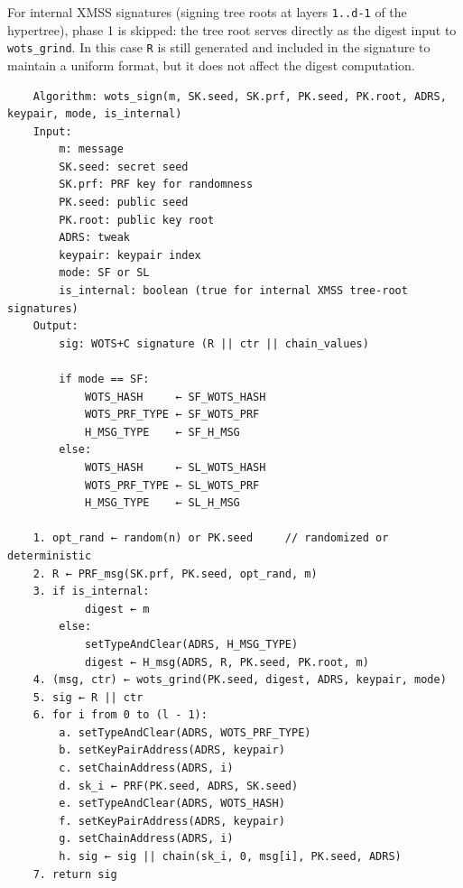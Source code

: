 For internal XMSS signatures (signing tree roots at layers \texttt{1..d-1} of the hypertree), phase 1 is skipped: the tree root serves directly as the digest input to \texttt{wots\_grind}. In this case \texttt{R} is still generated and included in the signature to maintain a uniform format, but it does not affect the digest computation.
\begin{verbatim}
    Algorithm: wots_sign(m, SK.seed, SK.prf, PK.seed, PK.root, ADRS, keypair, mode, is_internal)
    Input:
        m: message 
        SK.seed: secret seed
        SK.prf: PRF key for randomness
        PK.seed: public seed
        PK.root: public key root
        ADRS: tweak
        keypair: keypair index
        mode: SF or SL
        is_internal: boolean (true for internal XMSS tree-root signatures)
    Output:
        sig: WOTS+C signature (R || ctr || chain_values)

        if mode == SF:
            WOTS_HASH     ← SF_WOTS_HASH
            WOTS_PRF_TYPE ← SF_WOTS_PRF
            H_MSG_TYPE    ← SF_H_MSG
        else:
            WOTS_HASH     ← SL_WOTS_HASH
            WOTS_PRF_TYPE ← SL_WOTS_PRF
            H_MSG_TYPE    ← SL_H_MSG

    1. opt_rand ← random(n) or PK.seed     // randomized or deterministic
    2. R ← PRF_msg(SK.prf, PK.seed, opt_rand, m)
    3. if is_internal:
            digest ← m
        else:
            setTypeAndClear(ADRS, H_MSG_TYPE)
            digest ← H_msg(ADRS, R, PK.seed, PK.root, m)
    4. (msg, ctr) ← wots_grind(PK.seed, digest, ADRS, keypair, mode)
    5. sig ← R || ctr
    6. for i from 0 to (l - 1):
        a. setTypeAndClear(ADRS, WOTS_PRF_TYPE)
        b. setKeyPairAddress(ADRS, keypair)
        c. setChainAddress(ADRS, i)
        d. sk_i ← PRF(PK.seed, ADRS, SK.seed)
        e. setTypeAndClear(ADRS, WOTS_HASH)
        f. setKeyPairAddress(ADRS, keypair)
        g. setChainAddress(ADRS, i)
        h. sig ← sig || chain(sk_i, 0, msg[i], PK.seed, ADRS)
    7. return sig
\end{verbatim}

